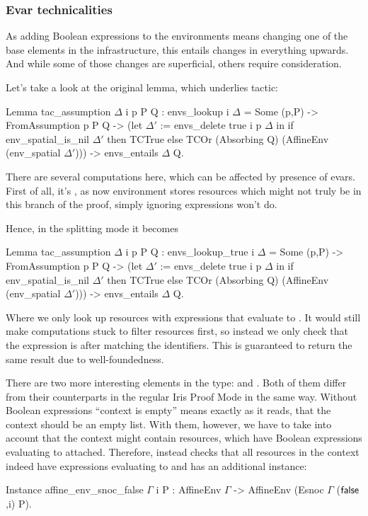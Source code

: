 {\subsubsection{Evar technicalities}
\label{subsubsec:evar_technicalities}

As adding Boolean expressions to the environments means changing one of the base elements in the infrastructure, this entails changes in everything upwards.
And while some of those changes are superficial, others require consideration.

Let's take a look at the original  lemma, which underlies  tactic:
\begin{coq}
  Lemma tac_assumption $\Delta$ i p P Q :
  envs_lookup i $\Delta$ = Some (p,P) ->
  FromAssumption p P Q ->
  (let $\Delta'$ := envs_delete true i p $\Delta$ in
   if env_spatial_is_nil $\Delta'$ then TCTrue
   else TCOr (Absorbing Q) (AffineEnv (env_spatial $\Delta'$))) ->
  envs_entails $\Delta$ Q.
\end{coq}

There are several computations here, which can be affected by presence of evars.
First of all, it's , as now environment stores resources which might not truly be in this branch of the proof, simply ignoring expressions won't do.

Hence, in the splitting mode it becomes
\begin{coq}
Lemma tac_assumption $\Delta$ i p P Q :
  envs_lookup_true i $\Delta$ = Some (p,P) ->
  FromAssumption p P Q ->
  (let $\Delta'$ := envs_delete true i p $\Delta$ in
   if env_spatial_is_nil $\Delta'$ then TCTrue
   else TCOr (Absorbing Q) (AffineEnv (env_spatial $\Delta'$))) ->
  envs_entails $\Delta$ Q.
\end{coq}

Where we only look up resources with expressions that evaluate to \true.
It would still make computations stuck to filter resources first, so instead we only check that the expression is \true after matching the identifiers.
This is guaranteed to return the same result due to well-foundedness.

There are two more interesting elements in the type:  and .
Both of them differ from their counterparts in the regular Iris Proof Mode in the same way.
Without Boolean expressions ``context is empty'' means exactly as it reads, that the context should be an empty list.
With them, however, we have to take into account that the context might contain resources, which have Boolean expressions evaluating to \false attached.
Therefore,  instead checks that all resources in the context indeed have expressions evaluating to \false and  has an additional instance:
\begin{coq}
  Instance affine_env_snoc_false $\Gamma$ i P :
  AffineEnv $\Gamma$ -> AffineEnv (Esnoc $\Gamma$ ($\textsf{false}$,i) P).
\end{coq}

}
